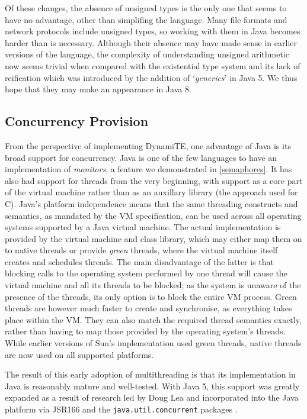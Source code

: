 Of these changes, the absence of unsigned types is the only one that
seems to have no advantage, other than simplifing the language.  Many
file formats and network protocols include unsigned types, so working
with them in Java becomes harder than is necessary.  Although their
absence may have made sense in earlier versions of the language, the
complexity of understanding unsigned arithmetic now seems trivial when
compared with the existential type system and its lack of reification
which was introduced by the addition of `\emph{generics}' in Java 5.
We thus hope that they may make an appearance in Java 8.

\subsection{Concurrency Provision}
\label{java:concurrency}

From the perspective of implementing DynamiTE, one advantage of Java
is its broad support for concurrency.  Java is one of the few
languages to have an implementation of \emph{monitors}, a feature we
demonstrated in \ref{semaphores}.  It has also had support for threads
from the very beginning, with support as a core part of the virtual
machine rather than as an auxillary library (the approach used for C).
Java's platform independence means that the same threading constructs
and semantics, as mandated by the VM specification\cite{vmspec}, can
be used across all operating systems supported by a Java virtual
machine.  The actual implementation is provided by the virtual machine
and class library, which may either map them on to native threads or
provide \emph{green} threads, where the virtual machine itself creates
and schedules threads.  The main disadvantage of the latter is that
blocking calls to the operating system performed by one thread will
cause the virtual machine and all its threads to be blocked; as the
system is unaware of the presence of the threads, its only option is
to block the entire VM process.  Green threads are however much faster
to create and synchronise, as everything takes place within the VM.
They can also match the required thread semantics exactly, rather than
having to map those provided by the operating system's threads.  While
earlier versions of Sun's implementation used green threads, native
threads are now used on all supported platforms.

The result of this early adoption of multithreading is that its
implementation in Java is reasonably mature and well-tested.  With
Java 5, this support was greatly expanded as a result of research led
by Doug Lea and incorporated into the Java platform via JSR166 and the
\texttt{java.util.concurrent} packages \cite{concpractice,jsr166}.

